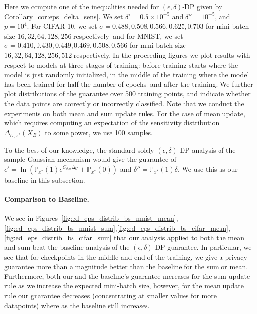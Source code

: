 Here we compute one of the inequalities needed for $(\epsilon,\delta)$-DP given by Corollary~\ref{cor:eps_delta_sens}.
We set $\delta' = 0.5 \times 10^{-5}$ and $\delta'' = 10^{-5}$, and $p = 10^{4}$. For CIFAR-10, we set $\sigma =  0.488, 0.508, 0.566, 0.625, 0.703$ for mini-batch size $16, 32, 64, 128, 256$ respectively; and for MNIST, we set $\sigma =  0.410, 0.430, 0.449, 0.469, 0.508, 0.566$ for mini-batch size $16, 32, 64, 128, 256, 512$ respectively.
In the proceeding figures we plot results with respect to models at three stages of training: before training starts where the model is just randomly initialized, in the middle of the training where the model has been trained for half the number of epochs, and after the training. We further plot distributions of the guarantee over 500 training points, and indicate whether the data points are correctly or incorrectly classified. Note that we conduct the experiments on both mean and sum update rules. For the case of mean update, which requires computing an expectation of the sensitivity distribution $\Delta_{U,x^*}(X_B)$ to some power, we use 100 samples.

To the best of our knowledge, the standard solely $(\epsilon,\delta)$-DP analysis of the sample Gaussian mechanism would give the guarantee of $\epsilon' = \ln( \mathbb{P}_{x^*}(1) e^{C_{\delta,\sigma} \Delta_{U}} + \mathbb{P}_{x^*}(0))$ and $\delta'' = \mathbb{P}_{x^*}(1) \delta$. We use this as our baseline in this subsection.





\paragraph{Comparison to Baseline.} We see in Figures~\ref{fig:ed_eps_distrib_bs_mnist_mean},\ref{fig:ed_eps_distrib_bs_mnist_sum},\ref{fig:ed_eps_distrib_bs_cifar_mean},\ref{fig:ed_eps_distrib_bs_cifar_sum} that our analysis applied to both the mean and sum beat the baseline analysis of the $(\epsilon,\delta)$-DP guarantee. In particular, we see that for checkpoints in the middle and end of the training, we give a privacy guarantee more than a magnitude better than the baseline for the sum or mean. Furthermore, both our and the baseline's guarantee increases for the sum update rule as we increase the expected mini-batch size, however, for the mean update rule our guarantee decreases (concentrating at smaller values for more datapoints) where as the baseline still increases. 







